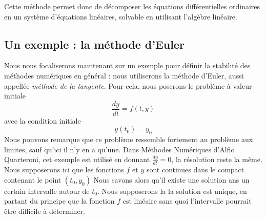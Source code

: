 \documentclass[12pt]{article}
\begin{document}



\quad Cette méthode permet donc de décomposer les équations différentielles ordinaires en un système d'équations linéaires, solvable en utilisant l'algèbre linéaire.

\subsection{Un exemple : la méthode d'Euler}

\quad Nous nous focaliserons maintenant sur un exemple pour définir la stabilité des méthodes numériques en général : nous utiliserons la méthode d'Euler, aussi appellée \emph{méthode de la tangente}.  Pour cela, nous poserons le problème à valeur initiale
\begin{equation} \label{problemevaleurinitiale}
\frac{dy}{dt} = f(t,y)
\end{equation}
avec la condition initiale
\begin{equation} \label{condInitPVI}
y(t_0) = y_0
\end{equation}
Nous pouvons remarque que ce problème ressemble fortement au problème aux limites, sauf qu'ici il n'y en a qu'une. Dans Méthodes Numériques d'Alfio Quarteroni, cet exemple est utilisé en donnant $\frac{dy}{dt} = 0$, la résolution reste la même.
\quad Nous supposerons ici que les fonctions $f$ et $y$ sont continues dans le compact contenant le point $(t_0, y_0)$ Nous savons alors qu'il existe une solution ans un certain intervalle autour de $t_0$.  Nous supposerons la la solution est unique, en partant du principe que la fonction $f$ est linéaire sans quoi l'intervalle pourrait être difficile à déterminer. 
\end{document}
